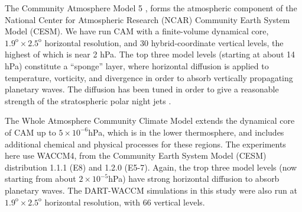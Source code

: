 The Community Atmosphere Model 5 \citep[CAM5]{nealeetal2010}, forms the atmospheric component of the National Center for Atmospheric Research (NCAR) Community Earth System Model (CESM). 
We have run CAM with a finite-volume dynamical core, $1.9^{\text{o}} \times 2.5^{\text{o}}$ horizontal resolution, and  30 hybrid-coordinate vertical levels, the highest of which is near 2 hPa.
The top three model levels (starting at about 14 hPa) constitute a ``sponge'' layer, where horizontal diffusion is applied to temperature, vorticity, and divergence in order to absorb vertically propagating planetary waves.  
The diffusion has been tuned in order to give a reasonable strength of the stratospheric polar night jets \citep{nealeetal2010}.

The Whole Atmosphere Community Climate Model \citep[WACCM]{Marsh2013} extends the dynamical core of CAM up to $5 \times 10^{-6}$hPa, which is in the lower thermosphere, and includes additional chemical and physical processes for these regions. 
The experiments here use WACCM4, from the Community Earth System Model (CESM) distribution 1.1.1 (E8) and 1.2.0 (E5-7). 
Again, the trop three model levels (now starting from about $2 \times 10^{-5}$hPa) have strong horizontal diffusion to absorb planetary waves. 
The DART-WACCM simulations in this study were also run at $1.9^{\text{o}} \times 2.5^{\text{o}}$ horizontal resolution, with 66 vertical levels. 

